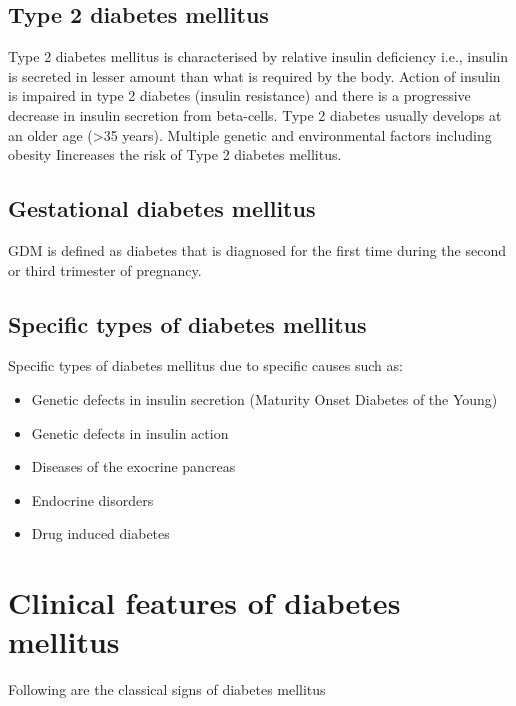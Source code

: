 \documentclass[
]{book}
\providecommand{\tightlist}{%
  \setlength{\itemsep}{0pt}\setlength{\parskip}{0pt}}
\begin{document}
\subsection{Type 2 diabetes mellitus}\label{type-2-diabetes-mellitus}

Type 2 diabetes mellitus is characterised by relative insulin deficiency i.e., insulin is secreted in lesser amount than what is required by the body. Action of insulin is impaired in type 2 diabetes (insulin resistance) and there is a progressive decrease in insulin secretion from beta-cells. Type 2 diabetes usually develops at an older age (\textgreater35 years). Multiple genetic and environmental factors including obesity Iincreases the risk of Type 2 diabetes mellitus.

\subsection{Gestational diabetes mellitus}\label{gestational-diabetes-mellitus}

GDM is defined as diabetes that is diagnosed for the first time during the second or third trimester of pregnancy.

\subsection{Specific types of diabetes mellitus}\label{specific-types-of-diabetes-mellitus}

Specific types of diabetes mellitus due to specific causes such as:

\begin{itemize}
\tightlist
\item
  Genetic defects in insulin secretion (Maturity Onset Diabetes of the Young)
\item
  Genetic defects in insulin action
\item
  Diseases of the exocrine pancreas
\item
  Endocrine disorders
\item
  Drug induced diabetes
\end{itemize}

\section{Clinical features of diabetes mellitus}\label{clinical-features-of-diabetes-mellitus}

Following are the classical signs of diabetes mellitus
\end{document}
